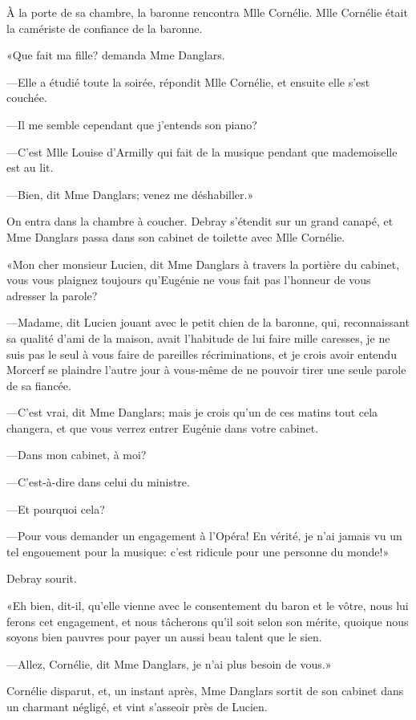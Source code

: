 À la porte de sa chambre, la baronne rencontra Mlle Cornélie. Mlle Cornélie était la camériste de confiance de la baronne. 

«Que fait ma fille? demanda Mme Danglars. 

—Elle a étudié toute la soirée, répondit Mlle Cornélie, et ensuite elle s'est couchée. 

—Il me semble cependant que j'entends son piano? 

—C'est Mlle Louise d'Armilly qui fait de la musique pendant que mademoiselle est au lit. 

—Bien, dit Mme Danglars; venez me déshabiller.» 

On entra dans la chambre à coucher. Debray s'étendit sur un grand canapé, et Mme Danglars passa dans son cabinet de toilette avec Mlle Cornélie. 

«Mon cher monsieur Lucien, dit Mme Danglars à travers la portière du cabinet, vous vous plaignez toujours qu'Eugénie ne vous fait pas l'honneur de vous adresser la parole? 

—Madame, dit Lucien jouant avec le petit chien de la baronne, qui, reconnaissant sa qualité d'ami de la maison, avait l'habitude de lui faire mille caresses, je ne suis pas le seul à vous faire de pareilles récriminations, et je crois avoir entendu Morcerf se plaindre l'autre jour à vous-même de ne pouvoir tirer une seule parole de sa fiancée. 

—C'est vrai, dit Mme Danglars; mais je crois qu'un de ces matins tout cela changera, et que vous verrez entrer Eugénie dans votre cabinet. 

—Dans mon cabinet, à moi? 

—C'est-à-dire dans celui du ministre. 

—Et pourquoi cela? 

—Pour vous demander un engagement à l'Opéra! En vérité, je n'ai jamais vu un tel engouement pour la musique: c'est ridicule pour une personne du monde!» 

Debray sourit. 

«Eh bien, dit-il, qu'elle vienne avec le consentement du baron et le vôtre, nous lui ferons cet engagement, et nous tâcherons qu'il soit selon son mérite, quoique nous soyons bien pauvres pour payer un aussi beau talent que le sien. 

—Allez, Cornélie, dit Mme Danglars, je n'ai plus besoin de vous.» 

Cornélie disparut, et, un instant après, Mme Danglars sortit de son cabinet dans un charmant négligé, et vint s'asseoir près de Lucien. 

